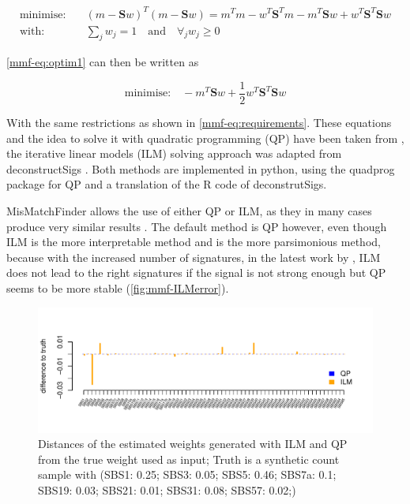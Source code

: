 \begin{align}
 \text{minimise:} & \quad (m - \textbf{S}w)^T(m - \textbf{S}w)
 = m^Tm - w^T\textbf{S}^Tm - m^T\textbf{S}w + w^T\textbf{S}^T\textbf{S}w \label{mmf-eq:optim1}\\
 \text{with:} & \quad \sum_j w_j = 1 \quad \text{and} \quad \forall_j w_j \geq 0 \label{mmf-eq:requirements}
\end{align}
\myequation[\ref{mmf-eq:optim1}]{MisMatchFinder: optimisation for signature weights}
\myequation[\ref{mmf-eq:requirements}]{MisMatchFinder: optimisation function restrictions}

\autoref{mmf-eq:optim1} can then be written as 

\begin{equation}
\text{minimise:} \quad - m^T\textbf{S}w + \frac{1}{2}w^T\textbf{S}^T\textbf{S}w
\label{mmf-eq:optim2}
\end{equation}
\myequation[\ref{mmf-eq:optim2}]{MisMatchFinder: quadratic programming formula}

With the same restrictions as shown in \autoref{mmf-eq:requirements}. These equations and the idea to solve it with quadratic programming (QP) have been taken from \textcite{Lynch2016}, the iterative linear models (ILM) solving approach was adapted from deconstructSigs \cite{Rosenthal2016}. Both methods are implemented in python, using the quadprog package \cite{McGibbon2021} for QP and a translation of the R code of deconstrutSigs.

MisMatchFinder allows the use of either QP or ILM, as they in many cases produce very similar results \cite{Lynch2016}. The default method is QP however, even though ILM is the more interpretable method and is the more parsimonious method, because with the increased number of signatures, in the latest work by \textcite{Alexandrov2020}, ILM does not lead to the right signatures if the signal is not strong enough but QP seems to be more stable (\autoref{fig:mmf-ILMerror}).

\begin{figure}[!ht]
\centering
\includegraphics[width=.99\linewidth]{Figures/lowInputSignalDeconv.pdf}
\caption[Distance of deconvolution methods from truth]{Distances of the estimated weights generated with ILM and QP from the true weight used as input; Truth is a synthetic count sample with (SBS1: 0.25; SBS3: 0.05; SBS5: 0.46; SBS7a: 0.1; SBS19: 0.03; SBS21: 0.01; SBS31: 0.08; SBS57: 0.02;)}\label{fig:mmf-ILMerror}
\end{figure}
 
